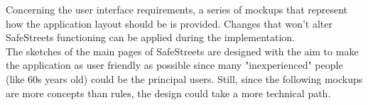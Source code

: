 Concerning the user interface requirements, a series of mockups that represent how the application layout should be is provided. Changes that won't alter SafeStreets functioning can be applied during the implementation.\\
The sketches of the main pages of SafeStreets are designed with the aim to make the application as user friendly as possible since many "inexperienced" people (like 60s years old) could be the principal users. Still, since the following mockups are more concepts than rules, the design could take a more technical path. \\
